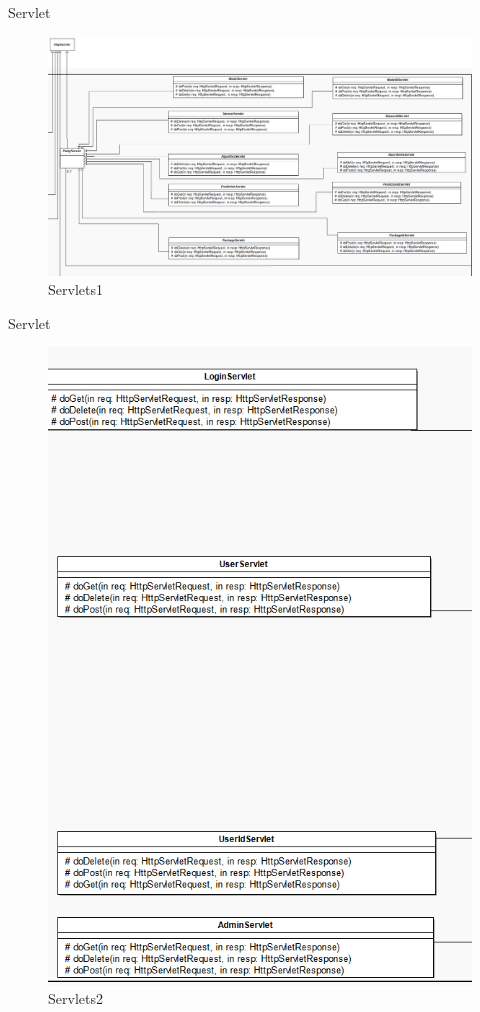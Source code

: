 \documentclass{beamer}
\begin{document}
	\begin{frame}{Servlet}
		\begin{figure}
			\centering
			\includegraphics[width=\linewidth]{Grafik/Klassendiagramme/Servlet1}
			\caption{Servlets1}
			\label{fig:Servlets1}
		\end{figure}
	\end{frame}	
	\begin{frame}{Servlet}
		\begin{figure}
			\centering
			\includegraphics[height=0.8\textheight]{Grafik/Klassendiagramme/Servlet2}
			\caption{Servlets2}
			\label{fig:Servlets2}
		\end{figure}
	\end{frame}
	
\end{document}
